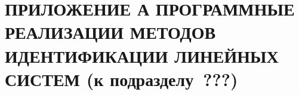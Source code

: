 \renewcommand{\thefigure}{\Asbuk{section}.\arabic{figure}}
\renewcommand{\thetable}{\Asbuk{section}.\arabic{table}}
\renewcommand{\thelstlisting}{\Asbuk{section}.\arabic{lstlisting}}

\chapter*{%
  ПРИЛОЖЕНИЕ А \hspace{10cm}
  ПРОГРАММНЫЕ РЕАЛИЗАЦИИ МЕТОДОВ \hspace{10cm}
  ИДЕНТИФИКАЦИИ ЛИНЕЙНЫХ СИСТЕМ  \hspace{10cm}
  (к подразделу~???)
}

\setcounter{section}{1}
\setcounter{figure}{0}
\setcounter{table}{0}
\setcounter{lstlisting}{0}

\vspace{-\baselineskip}


\vspace{0.5\baselineskip}

